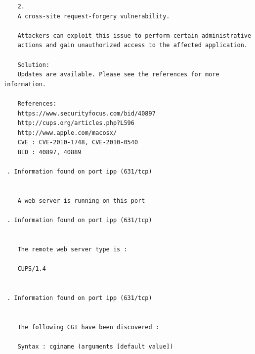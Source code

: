 \documentclass[twoside]{article}
\begin{document}
\begin{lstlisting}
    2.
    A cross-site request-forgery vulnerability.
    
    Attackers can exploit this issue to perform certain administrative
    actions and gain unauthorized access to the affected application.
    
    Solution:
    Updates are available. Please see the references for more information.
    
    References:
    https://www.securityfocus.com/bid/40897
    http://cups.org/articles.php?L596
    http://www.apple.com/macosx/
    CVE : CVE-2010-1748, CVE-2010-0540
    BID : 40897, 40889

 . Information found on port ipp (631/tcp)


    A web server is running on this port

 . Information found on port ipp (631/tcp)


    The remote web server type is :
    
    CUPS/1.4
    

 . Information found on port ipp (631/tcp)


    The following CGI have been discovered :
    
    Syntax : cginame (arguments [default value])
    

\end{lstlisting}
\end{document}
